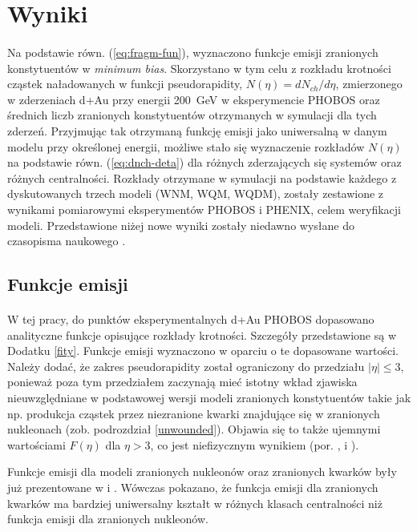 \documentclass[a4paper,12pt]{article}
\begin{document}
\newpage
\section{Wyniki}
\paragraph{}
Na podstawie równ. (\ref{eq:fragm-fun}), wyznaczono funkcje emisji zranionych konstytuentów w \textit{minimum bias}. Skorzystano w tym celu z rozkładu krotności cząstek naładowanych w funkcji pseudorapidity, $N(\eta) = dN_{ch}/d\eta$, zmierzonego w zderzeniach d+Au przy energii 200~GeV w eksperymencie PHOBOS \cite{Back:2004mr} oraz średnich liczb zranionych konstytuentów otrzymanych w symulacji dla tych zderzeń. Przyjmując tak otrzymaną funkcję emisji jako uniwersalną w danym modelu przy określonej energii, możliwe stało się wyznaczenie rozkładów $N(\eta)$ na podstawie równ. (\ref{eq:dnch-deta}) dla różnych zderzających się systemów oraz różnych centralności. Rozkłady otrzymane w symulacji na podstawie każdego z dyskutowanych trzech modeli (WNM, WQM, WQDM), zostały zestawione z wynikami pomiarowymi eksperymentów PHOBOS i PHENIX, celem weryfikacji modeli. Przedstawione niżej nowe wyniki zostały niedawno wysłane do czasopisma naukowego \cite{Barej:2019xef}.


\subsection{Funkcje emisji} \label{fkcje-emisji}
\paragraph{}
W tej pracy, do punktów eksperymentalnych d+Au PHOBOS \cite{Back:2004mr} dopasowano analityczne funkcje opisujące rozkłady krotności. Szczegóły przedstawione są w Dodatku \ref{fity}. Funkcje emisji wyznaczono w oparciu o te dopasowane wartości. Należy dodać, że zakres pseudorapidity został ograniczony do przedziału $|\eta| \le 3$, ponieważ poza tym przedziałem zaczynają mieć istotny wkład zjawiska nieuwzględniane w podstawowej wersji modeli zranionych konstytuentów takie jak np. produkcja cząstek przez niezranione kwarki znajdujące się w zranionych nukleonach (zob. podrozdział \ref{unwounded}). Objawia się to także ujemnymi wartościami $F(\eta)$ dla $\eta > 3$, co jest niefizycznym wynikiem (por. \cite{Bialas:2006kw}, \cite{Barej:pracaInz18} i \cite{Barej:2017kcw}).

Funkcje emisji dla modeli zranionych nukleonów oraz zranionych kwarków były już prezentowane w \cite{Barej:pracaInz18} i \cite{Barej:2017kcw}. Wówczas pokazano, że funkcja emisji dla zranionych kwarków ma bardziej uniwersalny kształt w różnych klasach centralności niż funkcja emisji dla zranionych nukleonów. 
\end{document}
